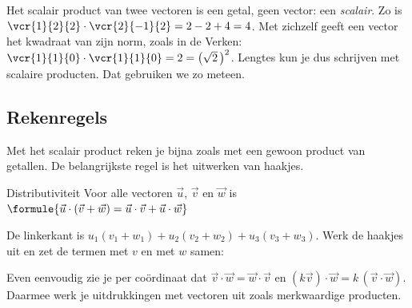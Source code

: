 Het scalair product van twee vectoren is een getal, geen vector: een \textit{scalair}. Zo is $\vcr{1}{2}{2} \cdot \vcr{2}{-1}{2} = 2 - 2 + 4 = 4$. Met zichzelf geeft een vector het kwadraat van zijn norm, zoals in de Verken: $\vcr{1}{1}{0} \cdot \vcr{1}{1}{0} = 2 = \bigl(\sqrt2\,\bigr)^2$. Lengtes kun je dus schrijven met scalaire producten. Dat gebruiken we zo meteen.

\subsection{Rekenregels}

Met het scalair product reken je bijna zoals met een gewoon product van getallen. De belangrijkste regel is het uitwerken van haakjes.

\begin{theorie}
\begin{stelling}{Distributiviteit}
Voor alle vectoren $\vec u$, $\vec v$ en $\vec w$ is \quad $\formule{\vec u \cdot (\vec v + \vec w) = \vec u \cdot \vec v + \vec u \cdot \vec w}$
\end{stelling}
\begin{bewijs}
De linkerkant is $u_1(v_1 + w_1) + u_2(v_2 + w_2) + u_3(v_3 + w_3)$. Werk de haakjes uit en zet de termen met $v$ en met $w$ samen:
\end{bewijs}
\end{theorie}

Even eenvoudig zie je per coördinaat dat $\vec v \cdot \vec w = \vec w \cdot \vec v$ en $(k\vec v) \cdot \vec w = k\,(\vec v \cdot \vec w)$. Daarmee werk je uitdrukkingen met vectoren uit zoals merkwaardige producten.


